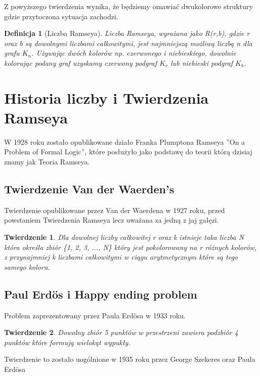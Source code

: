 \documentclass[11pt]{article}
\newtheorem{theorem}{Twierdzenie}
\newtheorem{definition}{Definicja}[section]
\begin{document}
Z powyższego twierdzenia wynika, że będziemy omawiać dwukolorowe struktury gdzie przytoczona sytuacja zachodzi. 

\begin{definition}[Liczba Ramseya]
Liczba Ramseya, wyrażana jako R(r,b), gdzie r oraz b są dowolnymi liczbami całkowitymi, jest najmniejszą możliwą liczbą n dla grafu $\mathit{K}_{n}$. Używając dwóch kolorów np. czerwonego i niebieskiego, dowolnie kolorując podany graf uzyskamy czerwony podgraf $\mathit{K}_{r}$ lub niebieski podgraf $\mathit{K}_{b}$.
\end{definition}

\section{Historia liczby i Twierdzenia Ramseya}

W 1928 roku zostało opublikowane działo Franka Plumptona Ramseya ''On a Problem of Formal Logic'', które posłużyło jako podstawę do teorii którą dzisiaj znamy jak Teoria Ramseya. 


\subsection{Twierdzenie Van der Waerden's}
Twierdzenie opublikowane przez Van der Waerdena w 1927 roku, przed powstaniem Twierdzenia Ramseya lecz uważana za jedną z jaj gałęzi. 

\begin{theorem}
Dla dowolnej liczby całkowitej r oraz k istnieje taka liczba N która określa zbiór \{1, 2, 3, ..., N\} który jest pokolorowany na r różnych kolorów, z przynajmniej k liczbami całkowitymi w ciągu arytmetycznym które są tego samego koloru.
\end{theorem}

\subsection{Paul Erd\"os i Happy ending problem}

Problem zaprezentowany przez Paula Erd\"osa w 1933 roku.

\begin{theorem}
Dowolny zbiór 5 punktów w przestrzeni zawiera podzbiór 4 punktów które formują wielokąt wypukły.
\end{theorem}

Twierdzenie to zostało uogólnione w 1935 roku przez George Szekeres oraz Paula Erd\"osa
\end{document}
